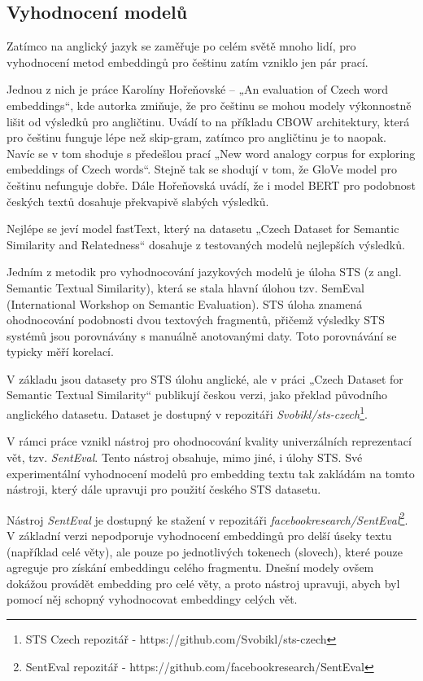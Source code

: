 \documentclass[thesis=M,czech]{FITthesis}[2019/12/23]
\begin{document}
\subsection{Vyhodnocení modelů}
\label{sec:model_evaluation}
Zatímco na anglický jazyk se zaměřuje po celém světě mnoho lidí, pro vyhodnocení metod embeddingů pro češtinu zatím vzniklo jen pár prací.

Jednou z nich je práce Karolíny Hořeňovské -- „An evaluation of Czech word embeddings“\cite{horenovska2019}, kde autorka zmiňuje, že pro češtinu se mohou modely výkonnostně lišit od výsledků pro angličtinu. Uvádí to na příkladu CBOW architektury, která pro češtinu funguje lépe než skip-gram, zatímco pro angličtinu je to naopak. Navíc se v tom shoduje s předešlou prací „New word analogy corpus for exploring  embeddings  of Czech words“\cite{svoboda2016}. Stejně tak se shodují v tom, že GloVe model pro češtinu nefunguje dobře. Dále Hořeňovská uvádí, že i model BERT pro podobnost českých textů dosahuje překvapivě slabých výsledků.

Nejlépe se jeví model fastText, který na datasetu „Czech Dataset for Semantic Similarity and Relatedness“\cite{konopik2017} dosahuje z testovaných modelů nejlepších výsledků.

Jedním z metodik pro vyhodnocování jazykových modelů je úloha STS (z angl. Semantic Textual Similarity), která se stala hlavní úlohou tzv. SemEval (International Workshop on Semantic Evaluation). STS úloha znamená ohodnocování podobnosti dvou textových fragmentů, přičemž výsledky STS systémů jsou porovnávány s manuálně anotovanými daty. Toto porovnávání se typicky měří korelací.

V základu jsou datasety pro STS úlohu anglické, ale v práci „Czech Dataset for Semantic Textual Similarity“\cite{svoboda2018} publikují českou verzi, jako překlad původního anglického datasetu. Dataset je dostupný v repozitáři \textit{Svobikl/sts-czech}\footnote{STS Czech repozitář - https://github.com/Svobikl/sts-czech}.

V rámci práce\cite{conneau2018} vznikl nástroj pro ohodnocování kvality univerzálních reprezentací vět, tzv. \textit{SentEval}. Tento nástroj obsahuje, mimo jiné, i úlohy STS. Své experimentální vyhodnocení modelů pro embedding textu tak zakládám na tomto nástroji, který dále upravuji pro použití českého STS datasetu.

Nástroj \textit{SentEval} je dostupný ke stažení v repozitáři  \textit{facebookresearch/SentEval}\footnote{SentEval repozitář - https://github.com/facebookresearch/SentEval}. V základní verzi nepodporuje vyhodnocení embeddingů pro delší úseky textu (například celé věty), ale pouze po jednotlivých tokenech (slovech), které pouze agreguje pro získání embeddingu celého fragmentu. Dnešní modely ovšem dokážou provádět embedding pro celé věty, a proto nástroj upravuji, abych byl pomocí něj schopný vyhodnocovat embeddingy celých vět.
\end{document}
